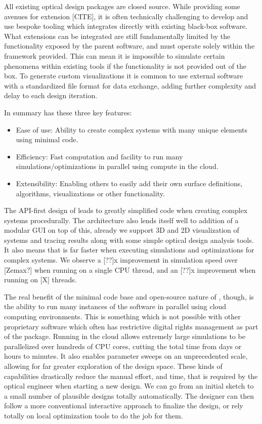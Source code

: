 \documentclass{juliacon}
\begin{document}
All existing optical design packages are closed source.
While providing some avenues for extension [CITE], it is often technically challenging to develop and use bespoke tooling which integrates directly with existing black-box software.
What extensions can be integrated are still fundamentally limited by the functionality exposed by the parent software, and must operate solely within the framework provided.
This can mean it is impossible to simulate certain phenomena within existing tools if the functionality is not provided out of the box.
To generate custom visualizations it is common to use external software with a standardized file format for data exchange, adding further complexity and delay to each design iteration.

In summary \OpticSim{} has these three key features:
\begin{itemize}
    \item Ease of use: Ability to create complex systems with many unique elements using minimal code.
    \item Efficiency: Fast computation and facility to run many simulations/optimizations in parallel using compute in the cloud.
    \item Extensibility: Enabling others to easily add their own surface definitions, algorithms, visualizations or other functionality.
\end{itemize}

The API-first design of \OpticSim{} leads to greatly simplified code when creating complex systems procedurally.
The architecture also lends itself well to addition of a modular GUI on top of this, already we support 3D and 2D visualization of systems and tracing results along with some simple optical design analysis tools.
It also means that \OpticSim{} is far faster when executing simulations and optimizations for complex systems.
We observe a [??]x improvement in simulation speed over [Zemax?] when running on a single CPU thread, and an [??]x improvement when running on [X] threads.

The real benefit of the minimal code base and open-source nature of \OpticSim{}, though, is the ability to run many instances of the software in parallel using cloud computing environments.
This is something which is not possible with other proprietary software which often has restrictive digital rights management as part of the package.
Running in the cloud allows extremely large simulations to be parallelized over hundreds of CPU cores, cutting the total time from days or hours to minutes.
It also enables parameter sweeps on an unprecedented scale, allowing for far greater exploration of the design space.
These kinds of capabilities drastically reduce the manual effort, and time, that is required by the optical engineer when starting a new design.
We can go from an initial sketch to a small number of plausible designs totally automatically.
The designer can then follow a more conventional interactive approach to finalize the design, or rely totally on local optimization tools to do the job for them.
\end{document}
